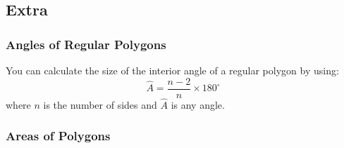 \documentclass[10pt,a4paper,titlepage,twoside,openright]{report}
\begin{document}
\subsection{Extra}
\label{mg:p:e}

\subsubsection{Angles of Regular Polygons}
You can calculate the size of the interior angle of a regular polygon by using:
\begin{equation}
\label{eq:mg:p:e:angles}
\hat A = \frac{n-2}n \times 180^\circ
\end{equation}
where $n$ is the number of sides and $\hat A$ is any angle.

\subsubsection{Areas of Polygons}
\end{document}
